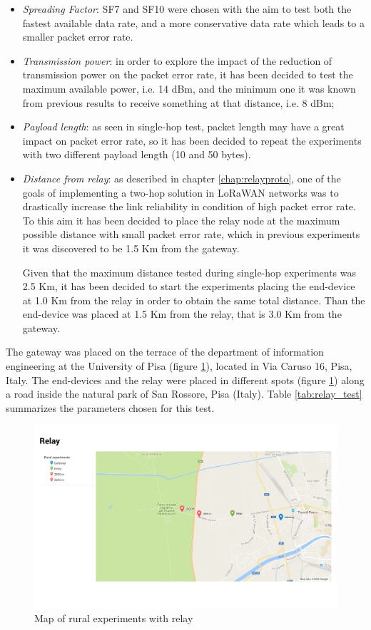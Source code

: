 \begin{itemize}
\item \emph{Spreading Factor}: SF7 and SF10 were chosen with the aim to test both the fastest available data rate, and a more conservative data rate which leads to a smaller packet error rate. 

\item \emph{Transmission power}: in order to explore the impact of the reduction of transmission power on the packet error rate, it has been decided to test the maximum available power, i.e. 14 dBm, and the minimum one it was known from previous results to receive something at that distance, i.e. 8 dBm;

\item \emph{Payload length}: as seen in single-hop test, packet length may have a great impact on packet error rate, so it has been decided to repeat the experiments with two different payload length (10 and 50 bytes).

\item \emph{Distance from relay}: as described in chapter \ref{chap:relayproto}, one of the goals of implementing a two-hop solution in LoRaWAN networks was to drastically increase the link reliability in condition of high packet error rate. To this aim it has been decided to place the relay node at the maximum possible distance with small packet error rate, which in previous experiments it was discovered to be 1.5 Km from the gateway. 

Given that the maximum distance tested during single-hop experiments was 2.5 Km, it has been decided to start the experiments placing the end-device at 1.0 Km from the relay in order to obtain the same total distance. Than the end-device was placed at 1.5 Km from the relay, that is 3.0 Km from the gateway.
\end{itemize}
The gateway was placed on the terrace of the department of information engineering at the University of Pisa (figure \ref{fig:maprelay}), located in Via Caruso 16, Pisa, Italy. The end-devices and the relay were placed in different spots (figure \ref{fig:maprelay}) along a road inside the natural park of San Rossore, Pisa (Italy). Table \ref{tab:relay_test} summarizes the parameters chosen for this test.

\begin{figure}[]
\centering
\includegraphics[width=\textwidth]{img/map_relay}
\caption{Map of rural experiments with relay}
\label{fig:maprelay}
\end{figure}

